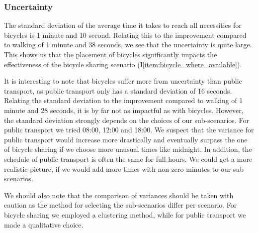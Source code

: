 \subsubsection{Uncertainty}

The standard deviation of the average time it takes to reach all necessities for bicycles is 1 minute and 10 second. 
Relating this to the improvement compared to walking of 1 minute and 38 seconds, we see that the uncertainty is quite large.
This shows us that the placement of bicycles significantly impacts the effectiveness of the bicycle sharing scenario (I\ref{item:bicycle_where_available}).

It is interesting to note that bicycles suffer more from uncertainty than public transport, as public transport only has a standard deviation of 16 seconds.
Relating the standard deviation to the improvement compared to walking of 1 minute and 28 seconds, it is by far not as impactful as with bicycles.
However, the standard deviation strongly depends on the choices of our sub-scenarios. 
For public transport we tried 08:00, 12:00 and 18:00.
We suspect that the variance for public transport would increase more drastically and eventually surpass the one of bicycle sharing if we choose more unusual times like midnight.
In addition, the schedule of public transport is often the same for full hours.
We could get a more realistic picture, if we would add more times with non-zero minutes to our sub scenarios.

We should also note that the comparison of variances should be taken with caution as the method for selecting the sub-scenarios differ per scenario.
For bicycle sharing we employed a clustering method, while for public transport we made a qualitative choice. 

%


